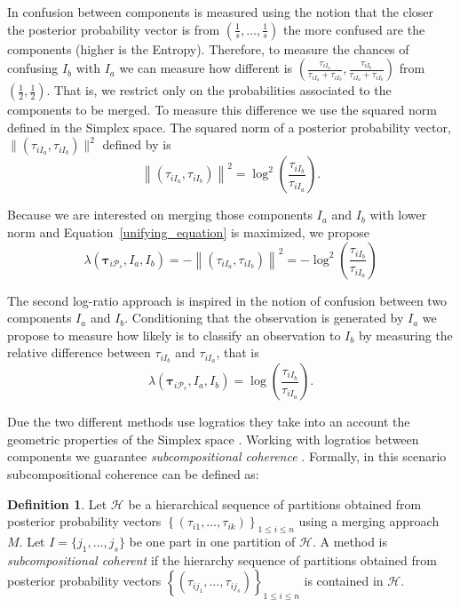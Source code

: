 \documentclass[10pt, a4paper]{article}
\theoremstyle{definition}
\newtheorem{defn}{Definition}[section]
\newcommand{\m}[1]{\boldsymbol{#1}}
\begin{document}
\begin{spacing}{1.9}
In \cite{baudry2010combining} confusion between components is measured using the notion that the closer the posterior probability vector is from $(\frac{1}{s}, \dots, \frac{1}{s})$ the more confused are the components (higher is the Entropy). Therefore, to measure the chances of confusing $I_b$ with $I_a$ we can measure how different is $(\frac{\tau_{i I_a}}{\tau_{i I_a} +\tau_{i I_b}}, \frac{\tau_{i I_b}}{\tau_{i I_a} + \tau_{i I_b}})$ from $(\frac{1}{2}, \frac{1}{2})$. That is, we restrict only on the probabilities associated to the components to be merged. To measure this difference we use the squared norm defined in the Simplex space. The squared norm of a posterior probability vector, $\| (\tau_{iI_a}, \tau_{iI_b}) \|^2$  defined by \cite{aitchison2002simplicial} is 
\[
\left\| (\tau_{iI_a}, \tau_{iI_b}) \right\|^2 = \log^2 \left(\frac{ \tau_{iI_b} }{ \tau_{iI_a} }\right).
\]

Because we are interested on merging those components $I_a$ and $I_b$ with lower norm and Equation~\ref{unifying_equation} is maximized, we propose
\[
\lambda(\m\tau_{i \mathcal{P}_s},  I_a,  I_b) = -\left\| (\tau_{iI_a}, \tau_{iI_b}) \right\|^2 = -\log^2 \left(\frac{ \tau_{iI_b} }{ \tau_{iI_a} }\right)
\]


The second log-ratio approach is inspired in the notion of confusion \citep{hennig2010methods} between two components $I_a$ and $I_b$. Conditioning that the observation is generated by $I_a$ we propose to measure how likely is to classify an observation to $I_b$ by measuring the relative difference between $\tau_{i I_b}$ and $\tau_{i I_a}$, that is 
\[
\lambda(\m\tau_{i \mathcal{P}_s},  I_a,  I_b) = \log \left(\frac{ \tau_{iI_b} }{ \tau_{iI_a} }\right).
\]


Due the two different methods use logratios they take into an account the geometric properties of the Simplex space \citep{aitchison2002simplicial}.  Working with logratios between components we guarantee \emph{subcompositional coherence}  \citep{aitchison1986statistical}. Formally, in this scenario subcompositional coherence can be defined as:

\begin{defn}
Let $\mathcal{H}$ be a hierarchical sequence of partitions obtained from posterior probability vectors $\left\{ \left(\tau_{i1}, \dots, \tau_{ik} \right)\right\}_{1\leq i \leq n}$ using a merging approach $M$. Let $I = \{j_1, \dots, j_s\}$ be one part in one partition of $\mathcal{H}$. A method is \emph{subcompositional coherent} if the hierarchy sequence of partitions obtained  from posterior probability vectors $\left\{ \left(\tau_{ij_1}, \dots, \tau_{ij_s} \right)\right\}_{1\leq i \leq n}$ is contained in $\mathcal{H}$.
\end{defn}


\end{spacing}
\end{document}
